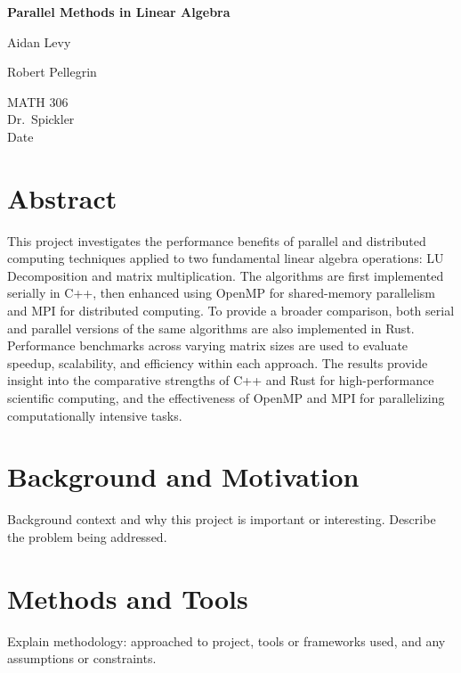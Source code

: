 \documentclass[12pt]{article}
\begin{document}
\begin{titlepage}
    \centering
    \vspace*{2in}
    {\Huge\bfseries Parallel Methods in Linear Algebra\par}
    \vspace{1in}
    {\Large Aidan Levy \par}
    {\Large Robert Pellegrin\par}
    \vspace{0.5in}
    {\large MATH 306\\ Dr.\ Spickler \\ Date\par}
    \vfill
\end{titlepage}

\newpage
\section*{Abstract}
\begin{singlespace}
    \noindent
    This project investigates the performance benefits of parallel and distributed computing techniques applied to two fundamental linear algebra operations:
    LU Decomposition and matrix multiplication. The algorithms are first implemented serially in C++, then enhanced using OpenMP for shared-memory parallelism
    and MPI for distributed computing. To provide a broader comparison, both serial and parallel versions of the same algorithms are also implemented in Rust.
    Performance benchmarks across varying matrix sizes are used to evaluate speedup, scalability, and efficiency within each approach.
    The results provide insight into the comparative strengths of C++ and Rust for high-performance scientific computing, and the effectiveness of OpenMP and
    MPI for parallelizing computationally intensive tasks.
\end{singlespace}

\section{Background and Motivation}
Background context and why this project is important or interesting. Describe the problem being addressed.

\section{Methods and Tools}
Explain methodology: approached to project, tools or frameworks used, and any assumptions or constraints.
\end{document}
